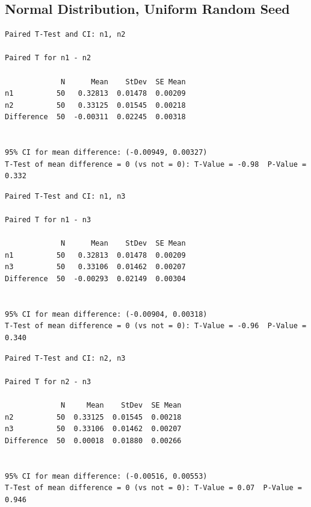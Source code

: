\documentclass[letterpaper,10pt]{article}
\begin{document}
\subsection{Normal Distribution, Uniform Random Seed}
\begin{samepage}
\begin{verbatim}
Paired T-Test and CI: n1, n2 

Paired T for n1 - n2

             N      Mean    StDev  SE Mean
n1          50   0.32813  0.01478  0.00209
n2          50   0.33125  0.01545  0.00218
Difference  50  -0.00311  0.02245  0.00318


95% CI for mean difference: (-0.00949, 0.00327)
T-Test of mean difference = 0 (vs not = 0): T-Value = -0.98  P-Value = 0.332
\end{verbatim}
\end{samepage}
\begin{samepage}
\begin{verbatim}
Paired T-Test and CI: n1, n3 

Paired T for n1 - n3

             N      Mean    StDev  SE Mean
n1          50   0.32813  0.01478  0.00209
n3          50   0.33106  0.01462  0.00207
Difference  50  -0.00293  0.02149  0.00304


95% CI for mean difference: (-0.00904, 0.00318)
T-Test of mean difference = 0 (vs not = 0): T-Value = -0.96  P-Value = 0.340
\end{verbatim}
\end{samepage}
\begin{samepage}
\begin{verbatim}
Paired T-Test and CI: n2, n3 

Paired T for n2 - n3

             N     Mean    StDev  SE Mean
n2          50  0.33125  0.01545  0.00218
n3          50  0.33106  0.01462  0.00207
Difference  50  0.00018  0.01880  0.00266


95% CI for mean difference: (-0.00516, 0.00553)
T-Test of mean difference = 0 (vs not = 0): T-Value = 0.07  P-Value = 0.946
\end{verbatim}
\end{samepage}
\end{document}
